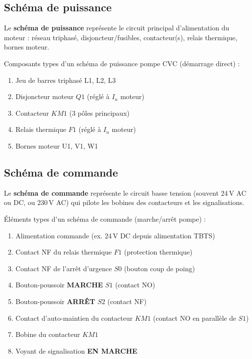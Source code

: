 \subsection{Schéma de puissance}

Le \textbf{schéma de puissance} représente le circuit principal d'alimentation du moteur : réseau triphasé, disjoncteur/fusibles, contacteur(s), relais thermique, bornes moteur.

\begin{definition}
  Composants types d'un schéma de puissance pompe CVC (démarrage direct) :
  \begin{enumerate}
    \item Jeu de barres triphasé L1, L2, L3
    \item Disjoncteur moteur $Q1$ (réglé à $I_n$ moteur)
    \item Contacteur $KM1$ (3 pôles principaux)
    \item Relais thermique $F1$ (réglé à $I_n$ moteur)
    \item Bornes moteur U1, V1, W1
  \end{enumerate}
\end{definition}

\subsection{Schéma de commande}

Le \textbf{schéma de commande} représente le circuit basse tension (souvent 24\,V AC ou DC, ou 230\,V AC) qui pilote les bobines des contacteurs et les signalisations.

\begin{definition}
  Éléments types d'un schéma de commande (marche/arrêt pompe) :
  \begin{enumerate}
    \item Alimentation commande (ex. 24\,V DC depuis alimentation TBTS)
    \item Contact NF du relais thermique $F1$ (protection thermique)
    \item Contact NF de l'arrêt d'urgence $S0$ (bouton coup de poing)
    \item Bouton-poussoir \textbf{MARCHE} $S1$ (contact NO)
    \item Bouton-poussoir \textbf{ARRÊT} $S2$ (contact NF)
    \item Contact d'auto-maintien du contacteur $KM1$ (contact NO en parallèle de $S1$)
    \item Bobine du contacteur $KM1$
    \item Voyant de signalisation \textbf{EN MARCHE}
  \end{enumerate}
\end{definition}

